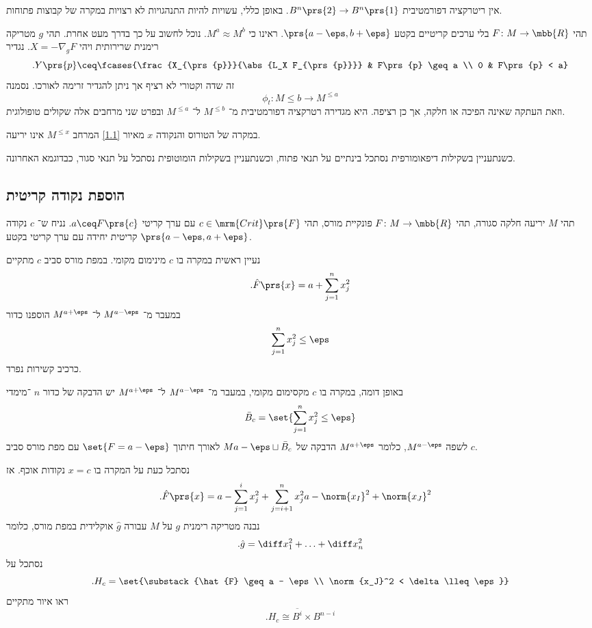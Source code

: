 \documentclass[a4paper,10pt,twoside,openany]{book}
\begin{document}
\begin{example}
אין ריטרקציה דפורמטיבית
$B^n\prs{2} \to B^n\prs{1}$.
באופן כללי, עשויות להיות התנהגויות לא רצויות במקרה של קבוצות פתוחות.
\end{example}

\begin{example}
תהי
$F \colon M \to \mbb{R}$
בלי ערכים קריטיים בקטע
$\prs{a-\eps, b+\eps}$.
ראינו כי
$M^a \approx M^b$.
נוכל לחשוב על כך בדרך מעט אחרת.
תהי
$g$
מטריקה רימנית שרירותית ויהי
$X = -\nabla_g F$.
נגדיר
\[\text{.} Y\prs{p} \ceq \fcases{\frac{X_{\prs{p}}}{\abs{L_X F_{\prs{p}}}} & F\prs{p} \geq a \\ 0 & F\prs{p} < a}\]
זה שדה וקטורי לא רציף אך ניתן להגדיר זרימה לאורכו.
נסמנה
\[\phi_t \colon M{\leq b} \to M^{\leq a}\]
וזאת העתקה שאינה הפיכה או חלקה, אך כן רציפה.
היא מגדירה רטרקציה דפורמטיבית מ־%
$M^{\leq b}$
ל־%
$M^{\leq a}$
ובפרט שני מרחבים אלה שקולים טופולוגית.
\end{example}

\begin{remark}
במקרה של הטורוס והנקודה
$x$
מאיור
\ref{1.1}
המרחב
$M^{\leq x}$
אינו יריעה.

כשנתעניין בשקילות דיפאומורפית נסתכל בינתיים על תנאי פתוח, וכשנתעניין בשקילות הומוטופית נסתכל על תנאי סגור, כבדוגמא האחרונה.
\end{remark}

\subsection{הוספת נקודה קריטית}

תהי
$M$
יריעה חלקה סגורה,
תהי
$F \colon M \to \mbb{R}$
פונקיית מורס, תהי
$c \in \mrm{Crit}\prs{F}$
עם ערך קריטי
$a \ceq F\prs{c}$.
נניח ש־%
$c$
נקודה קריטית יחידה עם ערך קריטי בקטע
$\prs{a-\eps,a+\eps}$.

נעיין ראשית במקרה בו
$c$
מינימום מקומי.
במפת מורס סביב
$c$
מתקיים
\[\text{.} \hat{F}\prs{x} = a + \sum_{j = 1}^n x_j^2\]
במעבר מ־%
$M^{a-\eps}$
ל־%
$M^{a+\eps}$
הוספנו כדור
\[\sum_{j = 1}^n x_j^2 \leq \eps\]
כרכיב קשירות נפרד.

באופן דומה, במקרה בו
$c$
מקסימום מקומי, במעבר מ־%
$M^{a-\eps}$
ל־%
$M^{a+\eps}$
יש הדבקה של כדור
$n$%
־מימדי
\[\bar{B}_c = \set{\sum_{j = 1}^n x_j^2 \leq \eps}\]
לשפה
$M^{a-\eps}$,
כלומר
$M^{a+\eps}$
הדבקה של
$M{a-\eps} \sqcup \bar{B}_c$
לאורך חיתוך
$\set{F = a - \eps}$
עם מפת מורס סביב
$c$.

נסתכל כעת על המקרה בו
$x = c$
נקודות אוכף. אז
\begin{align*}
\text{.} \hat{F}\prs{x} &= a - \sum_{j=1}^i x_j^2 + \sum_{j=i+1}^n x_j^2
a - \norm{x_I}^2 + \norm{x_J}^2
\end{align*}
נבנה מטריקה רימנית
$g$
על
$M$
עבורה
$\hat{g}$
אוקלידית במפת מורס, כלומר
\[\text{.} \hat{g} = \diff x_1^2 + \ldots + \diff x_n^2\]
נסתכל על
\[\text{.} H_c = \set{\substack{\hat{F} \geq a - \eps \\ \norm{x_J}^2 < \delta \lleq \eps}}\]
ראו איור
מתקיים
\[\text{.} H_c \cong \overline{B^i} \times B^{n-i}\]
\end{document}
